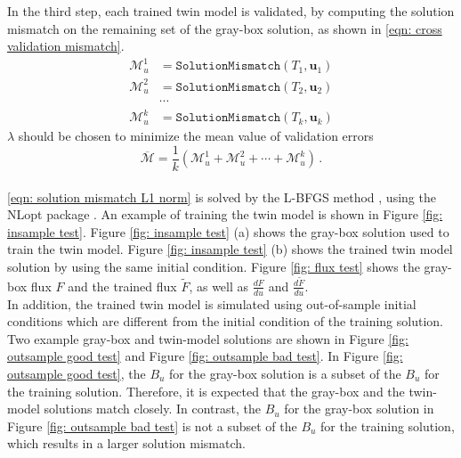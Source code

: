 In the third step, each trained twin model is validated, by computing
the solution mismatch on the remaining set of the gray-box solution, as shown in 
\eqref{eqn: cross validation mismatch}.
\begin{equation}\begin{split}
    \mathcal{M}_u^1 &= \texttt{SolutionMismatch}\left( T_1 , \boldsymbol{u}_1\right)\\
    \mathcal{M}_u^2 &= \texttt{SolutionMismatch}\left( T_2 , \boldsymbol{u}_2\right)\\
    &\cdots\\
    \mathcal{M}_u^k &= \texttt{SolutionMismatch}\left( T_k , \boldsymbol{u}_k\right)
    \label{eqn: cross validation mismatch}
\end{split}\end{equation}
$\lambda$ should be chosen to minimize
the mean value of validation errors
\begin{equation}
    \overline{\mathcal{M}} = \frac{1}{k}\left(\mathcal{M}_u^1 + \mathcal{M}_u^2 + \cdots 
    + \mathcal{M}_u^k\right)\,.
    \label{eqn: cross validation error mean}
\end{equation}\\


\eqref{eqn: solution mismatch L1 norm} is solved by the L-BFGS method \cite{LBFGS}, using the
NLopt package \cite{nlopt}.
An example of training the twin model is shown in Figure \ref{fig: insample test}.
Figure \ref{fig: insample test} (a) shows the gray-box solution used to train the twin model. 
Figure \ref{fig: insample test} (b) shows the trained twin model solution by using the same initial condition.
Figure \ref{fig: flux test} shows the gray-box flux $F$ and the trained flux $\tilde{F}$, as well as
$\frac{dF}{du}$ and $\frac{d\tilde{F}}{du}$.\\

In addition, the trained twin model is simulated using out-of-sample initial conditions which
are different from the initial condition of the training solution. 
Two example gray-box
and twin-model solutions are shown in Figure \ref{fig: outsample good test} and Figure \ref{fig: outsample bad test}.
In Figure \ref{fig: outsample good test}, the $B_u$ for the gray-box solution is a subset of the
$B_u$ for the training solution. Therefore, it is expected that the gray-box and the twin-model
solutions match closely. In contrast, the $B_u$ for the gray-box solution in Figure \ref{fig: outsample bad test}
is not a subset of the $B_u$ for the training solution, which results in a larger solution mismatch.\\

